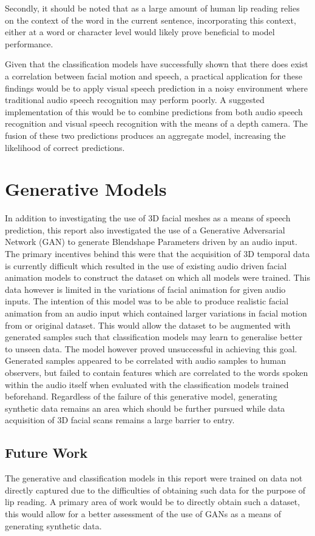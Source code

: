 Secondly, it should be noted that as a large amount of human lip reading relies on the context of the word in the current sentence, incorporating this context, either at a word or character level would likely prove beneficial to model performance.

Given that the classification models have successfully shown that there does exist a correlation between facial motion and speech, a practical application for these findings would be to apply visual speech prediction in a noisy environment where traditional audio speech recognition may perform poorly.
A suggested implementation of this would be to combine predictions from both audio speech recognition and visual speech recognition with the means of a depth camera.
The fusion of these two predictions produces an aggregate model, increasing the likelihood of correct predictions.

\section{Generative Models}
In addition to investigating the use of 3D facial meshes as a means of speech prediction, this report also investigated the use of a Generative Adversarial Network (GAN) to generate Blendshape Parameters driven by an audio input.
The primary incentives behind this were that the acquisition of 3D temporal data is currently difficult which resulted in the use of existing audio driven facial animation models to construct the dataset on which all models were trained.
This data however is limited in the variations of facial animation for given audio inputs.
The intention of this model was to be able to produce realistic facial animation from an audio input which contained larger variations in facial motion from or original dataset.
This would allow the dataset to be augmented with generated samples such that classification models may learn to generalise better to unseen data.
The model however proved unsuccessful in achieving this goal.
Generated samples appeared to be correlated with audio samples to human observers, but failed to contain features which are correlated to the words spoken within the audio itself when evaluated with the classification models trained beforehand.
Regardless of the failure of this generative model, generating synthetic data remains an area which should be further pursued while data acquisition of 3D facial scans remains a large barrier to entry.

\subsection{Future Work}
The generative and classification models in this report were trained on data not directly captured due to the difficulties of obtaining such data for the purpose of lip reading.
A primary area of work would be to directly obtain such a dataset, this would allow for a better assessment of the use of GANs as a means of generating synthetic data.

